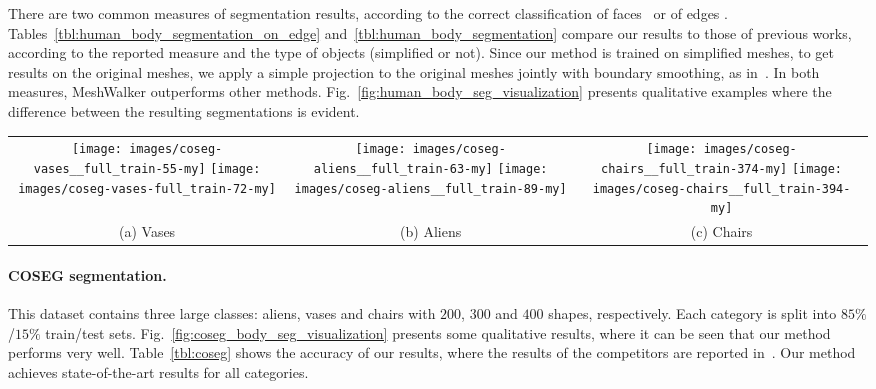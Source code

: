 \documentclass[acmtog]{acmart}
\begin{document}
There are two common measures of segmentation results, according to the correct classification of faces~\cite{haim2019surface} or of  edges \cite{hanocka2019meshcnn}.
Tables~\ref{tbl:human_body_segmentation_on_edge} and~\ref{tbl:human_body_segmentation} compare our results to those of previous works, according to the reported measure and the type of objects (simplified or not).
Since our method is trained on simplified meshes, to get results on the original meshes, we apply a simple projection to the original meshes jointly with boundary smoothing, as in~\cite{katz2003hierarchical}.
In both measures, MeshWalker outperforms other methods. 
Fig.~\ref{fig:human_body_seg_visualization} presents qualitative examples where the difference between the resulting segmentations is evident.






\begin{figure*}[htb]
\centering
\begin{tabular}{ccc}
\texttt{[image: images/coseg-vases\_\_full\_train-55-my]}
\texttt{[image: images/coseg-vases-full\_train-72-my]}&
\texttt{[image: images/coseg-aliens\_\_full\_train-63-my]}
\texttt{[image: images/coseg-aliens\_\_full\_train-89-my]}&
\texttt{[image: images/coseg-chairs\_\_full\_train-374-my]}
\texttt{[image: images/coseg-chairs\_\_full\_train-394-my]}\\
(a) Vases & (b) Aliens & (c) Chairs 
\end{tabular}
\caption{{\bf Qualitative results of segmentation for meshes from COSEG~\cite{wang2012active}.} 
} 
\label{fig:coseg_body_seg_visualization}
\end{figure*}


\paragraph{COSEG segmentation.}
This dataset contains three large classes: aliens, vases and chairs with $200$, $300$ and $400$ shapes,
respectively. 
Each category is split into $85\%$/$15\%$ train/test sets.
Fig.~\ref{fig:coseg_body_seg_visualization} presents some qualitative results, where it can be seen that our method performs very well.
Table~\ref{tbl:coseg} shows the accuracy of our results, where the results of the competitors are reported in~\cite{hanocka2019meshcnn}.
Our method achieves state-of-the-art results for all categories.
\end{document}
